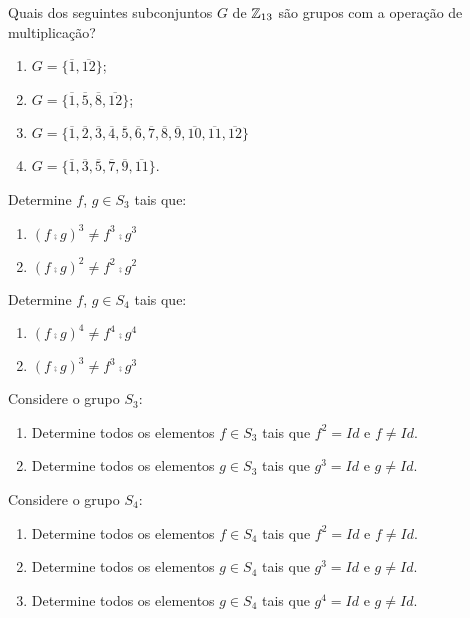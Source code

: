\documentclass[12pt]{article}
\begin{document}
\questao{} Quais dos seguintes subconjuntos $G$ de $\mathbb{Z}_{13}$ s{\~a}o grupos
com a opera{\c c}{\~a}o de multiplica{\c c}{\~a}o?
\begin{multicols}{2}
\begin{enumerate}[label=({\alph*})]
\item $G=\{\overline{1},\overline{12}\}$;

\item $G=\{\overline{1},\overline{5},\overline{8},\overline{12}\}$;

\item $G=\{\overline{1},\overline{2},\overline{3},\overline{4}, \overline{5},\overline{6},\overline{7},
 \overline{8},\overline{9},\overline{10},\overline{11},\overline{12}\}$
\item $G=\{\overline{1}, \overline{3},\overline{5},\overline{7},\overline{9},\overline{11}\}$.
\end{enumerate}
\end{multicols}

\vesp

\questao{} Determine $f$, $g \in S_3$ tais que:
\begin{enumerate}[label=({\alph*})]
	\item $(f \comp g)^3 \ne f^3\comp g^3$
	\item $(f \comp g)^2 \ne f^2\comp g^2$
\end{enumerate}

\vesp

\questao{} Determine $f$, $g \in S_4$ tais que:
\begin{enumerate}[label=({\alph*})]
	\item $(f \comp g)^4 \ne f^4\comp g^4$
	\item $(f \comp g)^3 \ne f^3\comp g^3$
\end{enumerate}

\vesp

\questao{} Considere o grupo $S_3$:
\begin{enumerate}[label=({\alph*})]
	\item Determine todos os elementos $f \in S_3$ tais que $f^2 = Id$ e $f \ne Id$.
	\item Determine todos os elementos $g \in S_3$ tais que $g^3 = Id$ e $g \ne Id$.
\end{enumerate}

\vesp

\questao{} Considere o grupo $S_4$:
\begin{enumerate}[label=({\alph*})]
	\item Determine todos os elementos $f \in S_4$ tais que $f^2 = Id$ e $f \ne Id$.
	\item Determine todos os elementos $g \in S_4$ tais que $g^3 = Id$ e $g \ne Id$.
	\item Determine todos os elementos $g \in S_4$ tais que $g^4 = Id$ e $g \ne Id$.
\end{enumerate}
\end{document}
